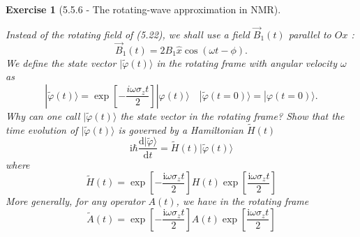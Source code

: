 \documentclass[12pt]{article}
\newtheorem{exercise}{Exercise}
\begin{document}
	\begin{exercise}[5.5.6 - The rotating-wave approximation in NMR]
		\begin{exercises}
			\item Instead of the rotating field of (5.22), we shall use a field $\vec{B}_{1}(t)$ parallel to $O x$ :
			$$
			\vec{B}_{1}(t)=2 B_{1} \hat{x} \cos (\omega t-\phi) .
			$$
			We define the state vector $|\tilde{\varphi}(t)\rangle$ in the rotating frame with angular velocity $\omega$ as
			$$
			|\tilde{\varphi}(t)\rangle=\exp \left[-\frac{i \omega \sigma_{z} t}{2}\right]|\varphi(t)\rangle \quad|\tilde{\varphi}(t=0)\rangle=|\varphi(t=0)\rangle .
			$$
			Why can one call $|\tilde{\varphi}(t)\rangle$ the state vector in the rotating frame? Show that the time evolution of $|\tilde{\varphi}(t)\rangle$ is governed by a Hamiltonian $\tilde{H}(t)$
			$$
			\mathrm{i} \hbar \frac{\mathrm{d}|\tilde{\varphi}\rangle}{\mathrm{d} t}=\tilde{H}(t)|\tilde{\varphi}(t)\rangle
			$$
			where
			$$
			\tilde{H}(t)=\exp \left[-\frac{\mathrm{i} \omega \sigma_{z} t}{2}\right] H(t) \exp \left[\frac{\mathrm{i} \omega \sigma_{z} t}{2}\right]
			$$
			More generally, for any operator $A(t)$, we have in the rotating frame
			$$
			\tilde{A}(t)=\exp \left[-\frac{\mathrm{i} \omega \sigma_{z} t}{2}\right] A(t) \exp \left[\frac{\mathrm{i} \omega \sigma_{z} t}{2}\right]
			$$
			\begin{multianswer}
				
			\end{multianswer}
			
			
			
		\end{exercises}
		
	\end{exercise}
	
\end{document}
